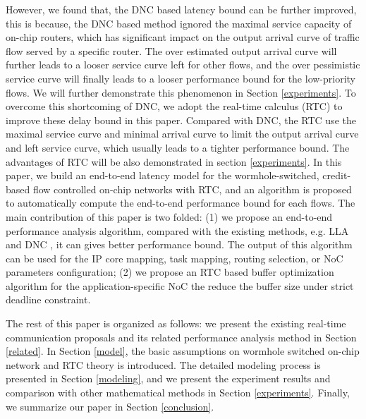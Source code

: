 \documentclass[10pt,journal]{IEEEtran}
\begin{document}
However, we found that, the DNC based latency bound can be further improved, this is because, the DNC based method \cite{Qian489900} ignored the maximal service capacity of on-chip routers, which has significant impact on the output arrival curve of traffic flow served by a specific router. The over estimated output arrival curve will further leads to a looser service curve left for other flows, and the over pessimistic service curve will finally leads to a looser performance bound for the low-priority flows. We will further demonstrate this phenomenon in Section \ref{experiments}. To overcome this shortcoming of DNC, we adopt the real-time calculus (RTC) to improve these delay bound in this paper. Compared with DNC, the RTC use the maximal service curve and minimal arrival curve to limit the output arrival curve and left service curve, which usually leads to a tighter performance bound. The advantages of RTC will be also demonstrated in section \ref{experiments}. In this paper, we build an end-to-end latency model for the wormhole-switched, credit-based flow controlled on-chip networks with RTC, and an algorithm is proposed to automatically compute the end-to-end performance bound for each flows. The main contribution of this paper is two folded: (1) we propose an end-to-end performance analysis algorithm, compared with the existing methods, e.g. LLA \cite{73}\cite{189} and DNC \cite{Qian489900}, it can gives better performance bound. The output of this algorithm can be used for the IP core mapping, task mapping, routing selection, or NoC parameters configuration; (2) we propose an RTC based buffer optimization algorithm for the application-specific NoC the reduce the buffer size under strict deadline constraint.

The rest of this paper is organized as follows: we present the existing real-time communication proposals and its related performance analysis method in Section \ref{related}. In Section \ref{model}, the basic assumptions on wormhole switched on-chip network and RTC theory is introduced. The detailed modeling process is presented in Section \ref{modeling}, and we present the experiment results and comparison with other mathematical methods in Section \ref{experiments}. Finally, we summarize our paper in Section \ref{conclusion}.
\end{document}
